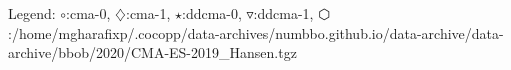 Legend: {\color{NavyBlue}$\circ$}:cma-0, {\color{Magenta}$\diamondsuit$}:cma-1, {\color{Orange}$\star$}:ddcma-0, {\color{CornflowerBlue}$\triangledown$}:ddcma-1, {\color{red}$\varhexagon$}:/home/mgharafixp/.cocopp/data-archives/numbbo.github.io/data-archive/data-archive/bbob/2020/CMA-ES-2019\_Hansen.tgz